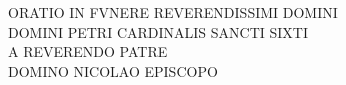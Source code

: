 \documentclass[a5paper,twoside]{article}
\begin{document}
\frenchspacing


\linespread{1.1}

\thispagestyle{empty}


\begin{pages}

\begin{Leftside}

\beginnumbering


\pstart


{\centering

\noindent ORATIO IN FVNERE REVERENDISSIMI DOMINI \\
DOMINI PETRI CARDINALIS SANCTI SIXTI \\
 A REVERENDO PATRE \\
DOMINO NICOLAO 
EPISCOPO \\

}

\pend
\vspace*{\baselineskip}

\numberpstarttrue

\setcounter{pstart}{1}


\end{Leftside}
\end{pages}
\end{document}
